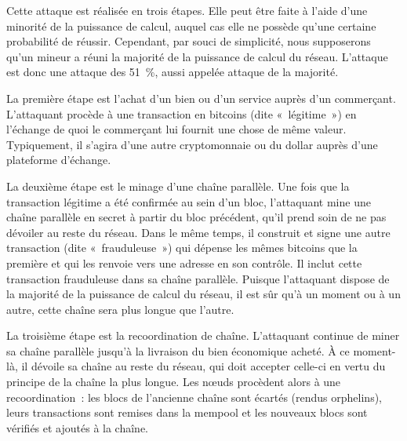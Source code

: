 
Cette attaque est réalisée en trois étapes. Elle peut être faite à l'aide d'une minorité de la puissance de calcul, auquel cas elle ne possède qu'une certaine probabilité de réussir. Cependant, par souci de simplicité, nous supposerons qu'un mineur a réuni la majorité de la puissance de calcul du réseau. L'attaque est donc une attaque des 51~\%, aussi appelée attaque de la majorité.

La première étape est l'achat d'un bien ou d'un service auprès d'un commerçant. L'attaquant procède à une transaction en bitcoins (dite «~légitime~») en l'échange de quoi le commerçant lui fournit une chose de même valeur. Typiquement, il s'agira d'une autre cryptomonnaie ou du dollar auprès d'une plateforme d'échange.

La deuxième étape est le minage d'une chaîne parallèle. Une fois que la transaction légitime a été confirmée au sein d'un bloc, l'attaquant mine une chaîne parallèle en secret à partir du bloc précédent, qu'il prend soin de ne pas dévoiler au reste du réseau. Dans le même temps, il construit et signe une autre transaction (dite «~frauduleuse~») qui dépense les mêmes bitcoins que la première et qui les renvoie vers une adresse en son contrôle. Il inclut cette transaction frauduleuse dans sa chaîne parallèle. Puisque l'attaquant dispose de la majorité de la puissance de calcul du réseau, il est sûr qu'à un moment ou à un autre, cette chaîne sera plus longue que l'autre.

La troisième étape est la recoordination de chaîne. L'attaquant continue de miner sa chaîne parallèle jusqu'à la livraison du bien économique acheté. À ce moment-là, il dévoile sa chaîne au reste du réseau, qui doit accepter celle-ci en vertu du principe de la chaîne la plus longue. Les nœuds procèdent alors à une recoordination~: les blocs de l'ancienne chaîne sont écartés (rendus orphelins), leurs transactions sont remises dans la mempool et les nouveaux blocs sont vérifiés et ajoutés à la chaîne.

